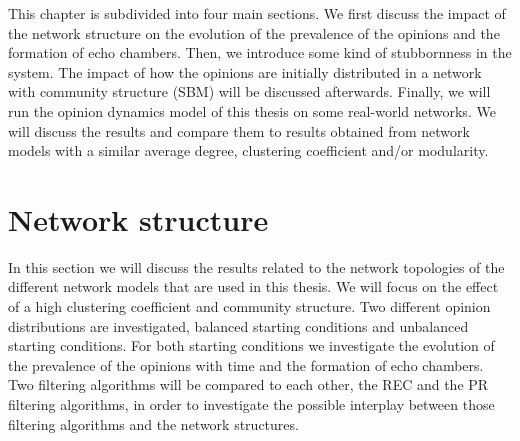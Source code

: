 \documentclass[11 pt , letterpaper , twoside , openright]{book}
\begin{document}
This chapter is subdivided into four main sections. We first discuss the impact of the network structure on the evolution of the prevalence of the opinions and the formation of echo chambers. Then, we introduce some kind of stubbornness in the system. The impact of how the opinions are initially distributed in a network with community structure (SBM) will be discussed afterwards. Finally, we will run the opinion dynamics model of this thesis on some real-world networks. We will discuss the results and compare them to results obtained from network models with a similar average degree, clustering coefficient and/or modularity.

\section{Network structure}\label{netw_struc}

In this section we will discuss the results related to the network topologies of the different network models that are used in this thesis. We will focus on the effect of a high clustering coefficient and community structure. Two different opinion distributions are investigated, balanced starting conditions and unbalanced starting conditions. For both starting conditions we investigate the evolution of the prevalence of the opinions with time and the formation of echo chambers. Two filtering algorithms will be compared to each other, the REC and the PR filtering algorithms, in order to investigate the possible interplay between those filtering algorithms and the network structures.\\
\end{document}
